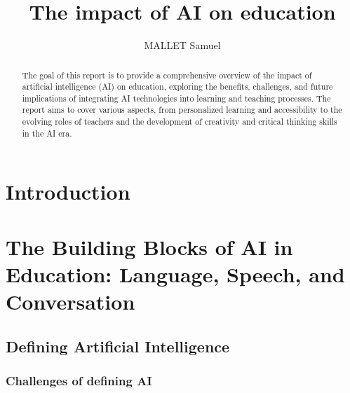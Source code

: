 \documentclass{article}
\title{The impact of AI on education}
\author{MALLET Samuel}
\begin{document}
\maketitle

\begin{abstract}
    The goal of this report is to provide a comprehensive
    overview of the impact of artificial intelligence (AI)
    on education, exploring the benefits, challenges, and
    future implications of integrating AI technologies into
    learning and teaching processes. The report aims to cover
    various aspects, from personalized learning and
    accessibility to the evolving roles of teachers and the
    development of creativity and critical thinking skills
    in the AI era.
\end{abstract}

\newpage

\tableofcontents

\newpage
\section{Introduction}

\newpage
\section{The Building Blocks of AI in Education: Language, Speech, and Conversation}
\subsection{Defining Artificial Intelligence}

\subsubsection{Challenges of defining AI}
\end{document}
